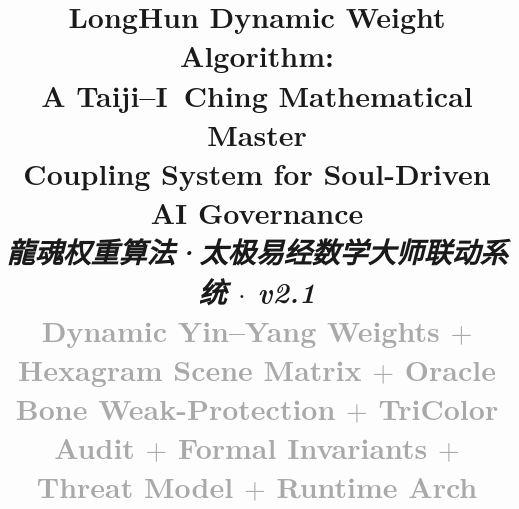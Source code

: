 \documentclass[conference]{IEEEtran}
\begin{document}

\title{%
  \textbf{LongHun Dynamic Weight Algorithm:\\
  A Taiji--I~Ching Mathematical Master\\
  Coupling System for Soul-Driven AI Governance}\\
  {\normalsize\textcolor{dragonRed}{\itshape
    龍魂权重算法·太极易经数学大师联动系统
    $\cdot$ v2.1}}\\
  {\small\textcolor{darkgray}{%
    Dynamic Yin--Yang Weights
    $+$ Hexagram Scene Matrix
    $+$ Oracle Bone Weak-Protection
    $+$ TriColor Audit
    $+$ Formal Invariants
    $+$ Threat Model
    $+$ Runtime Arch}}
}

\author{
}

\maketitle
\end{document}

